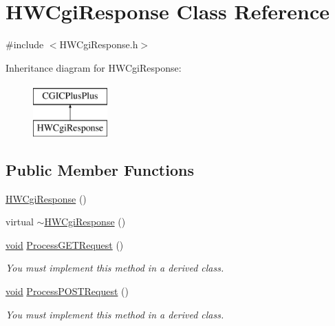 \hypertarget{class_h_w_cgi_response}{\section{\-H\-W\-Cgi\-Response \-Class \-Reference}
\label{class_h_w_cgi_response}
}


{\ttfamily \#include $<$\-H\-W\-Cgi\-Response.\-h$>$}

\-Inheritance diagram for \-H\-W\-Cgi\-Response\-:\begin{figure}[H]
\begin{center}
\leavevmode
\includegraphics[height=2.000000cm]{class_h_w_cgi_response}
\end{center}
\end{figure}
\subsection*{\-Public \-Member \-Functions}
\begin{DoxyCompactItemize}
\item 
\hyperlink{class_h_w_cgi_response_a99da269334186fe6a7006fb679ad7dee}{\-H\-W\-Cgi\-Response} ()
\item 
virtual \hyperlink{class_h_w_cgi_response_a51edc5778a5af09fa39ce9fced0a221d}{$\sim$\-H\-W\-Cgi\-Response} ()
\item 
\hyperlink{_cpclient_8h_a6464f7480a0fd0ee170cba12b2c0497f}{void} \hyperlink{class_h_w_cgi_response_a1a4b4b8f0f682f9dc0a9e71dd6fa2fe5}{\-Process\-G\-E\-T\-Request} ()
\begin{DoxyCompactList}\small\item\em \-You must implement this method in a derived class. \end{DoxyCompactList}\item 
\hyperlink{_cpclient_8h_a6464f7480a0fd0ee170cba12b2c0497f}{void} \hyperlink{class_h_w_cgi_response_aec2b369683ddd63bad010575451aaec3}{\-Process\-P\-O\-S\-T\-Request} ()
\begin{DoxyCompactList}\small\item\em \-You must implement this method in a derived class. \end{DoxyCompactList}\end{DoxyCompactItemize}



